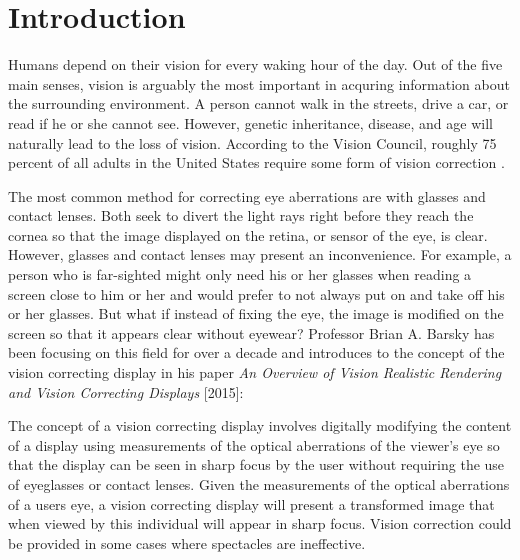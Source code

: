 \chapter{Introduction}

Humans depend on their vision for every waking hour of the day. Out of the five main senses, vision is arguably the most important in acquring information about the surrounding environment. A person cannot walk in the streets, drive a car, or read if he or she cannot see. However, genetic inheritance, disease, and age will naturally lead to the loss of vision. According to the Vision Council, roughly 75 percent of all adults in the United States require some form of vision correction \cite{GlassesCrafter.com:2010:Vision}. 

The most common method for correcting eye aberrations are with glasses and contact lenses. Both seek to divert the light rays right before they reach the cornea so that the image displayed on the retina, or sensor of the eye, is clear. However, glasses and contact lenses may present an inconvenience. For example, a person who is far-sighted might only need his or her glasses when reading a screen close to him or her and would prefer to not always put on and take off his or her glasses. But what if instead of fixing the eye, the image is modified on the screen so that it appears clear without eyewear? Professor Brian A. Barsky has been focusing on this field for over a decade and introduces to the concept of the vision correcting display in his paper \textit{An Overview of Vision Realistic Rendering and Vision Correcting Displays} [2015]:

\begin{displayquote}
The concept of a vision correcting display involves digitally modifying the content of a display using measurements of the optical aberrations of the viewer's eye so that the display can be seen in sharp focus by the user without requiring the use of eyeglasses or contact lenses. Given the measurements of the optical aberrations of a users eye, a vision correcting display will present a transformed image that when viewed by this individual will appear in sharp focus. Vision correction could be provided in some cases where spectacles are ineffective.
\end{displayquote}


